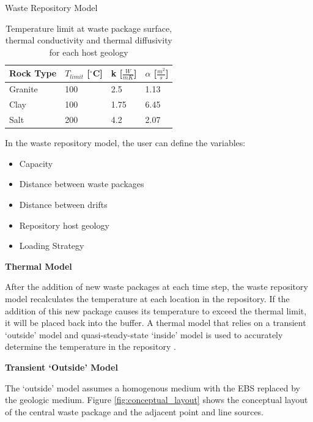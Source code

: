 \documentclass[final]{beamer}
\newlength{\onecolwid}
\newlength{\threecolwid}
\begin{document}
\begin{frame}[t]
\begin{columns}[t,totalwidth=\threecolwid]
\begin{column}{\onecolwid}
\begin{block}{Waste Repository Model}
\begin{table}[]
	\label{tab:temp_limit}
	\caption{Temperature limit at waste package surface, thermal conductivity 
	and thermal diffusivity for each host geology \cite{sutton_investigations_2011}}
	\begin{tabular}{|l|l|l|l|}
	\hline
	Rock Type & $T_{limit}$ [$^\circ$C] & k [$\frac{W}{mK}$] &  $\alpha$ [$\frac{m^2}{s}$]  \\ \hline
	Granite   & 100 & 2.5  & 1.13\\ \hline
	Clay      & 100 & 1.75 & 6.45\\ \hline
	Salt      & 200 & 4.2  & 2.07\\ \hline
	\end{tabular}
\end{table}

In the waste repository model, the user can define the variables: 
	\begin{itemize}
		\item Capacity
		\item Distance between waste packages
		\item Distance between drifts 
		\item Repository host geology 
		\item Loading Strategy 
	\end{itemize}

\vspace{0.7em}
\textbf{Thermal Model}

After the addition of new waste packages at each time step, the waste repository model 
recalculates the temperature at each location in the repository. 
If the addition of this new package causes its temperature to exceed the thermal 
limit, it will be placed back into the buffer. 
A thermal model that relies on a transient `outside' model and quasi-steady-state 
`inside' model is used to accurately determine the temperature in the repository
\cite{sutton_investigations_2011}. 

\vspace{0.7em}
\textbf{Transient `Outside' Model}

The `outside' model assumes a homogenous medium with the \gls{EBS} replaced by the 
geologic medium. 
Figure \ref{fig:conceptual_layout} shows the conceptual layout of the central waste 
package and the adjacent point and line sources. 


\end{block}
\end{column}
\end{columns}
\end{frame}
\end{document}

